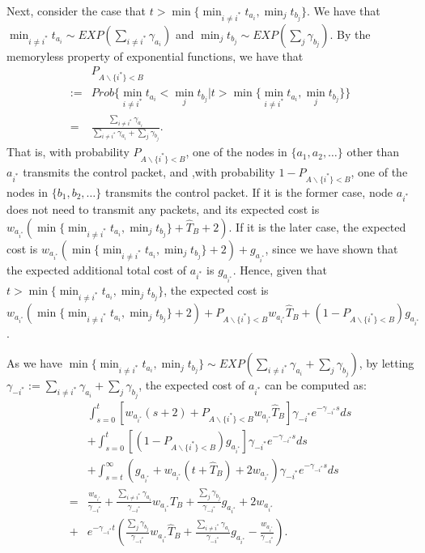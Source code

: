 \documentclass[11pt, conference]{IEEEtran}
\begin{document}
Next, consider the case that $t>\min\{\min_{i\neq i^*}t_{a_i}, \min_jt_{b_j}\}$. We have that $\min_{i\neq i^*}t_{a_i}\sim EXP(\sum_{i\neq i^*}\gamma_{a_i})$ and $\min_jt_{b_j}\sim EXP(\sum_j \gamma_{b_j})$. By the memoryless property of exponential functions, we have that
\begin{align*}
&P_{A\backslash\{i^*\}<B}\\
:=&Prob\{\min_{i\neq i^*}t_{a_i} < \min_jt_{b_j}|t>\min\{\min_{i\neq i^*}t_{a_i}, \min_jt_{b_j}\}\}\\
=&\frac{\sum_{i\neq i^*}\gamma_{a_i}}{\sum_{i\neq i^*}\gamma_{a_i}+\sum_{j}\gamma_{b_j}}.
\end{align*}
That is, with probability $P_{A\backslash\{i^*\}<B}$, one of the nodes in $\{a_1,a_2,\dots\}$ other than $a_{i^*}$ transmits the control packet, and ,with probability $1-P_{A\backslash\{i^*\}<B}$, one of the nodes in $\{b_1,b_2,\dots\}$ transmits the control packet. If it is the former case, node $a_{i^*}$ does not need to transmit any packets, and its expected cost is $w_{a_{i^*}}(\min\{\min_{i\neq i^*}t_{a_i}, \min_jt_{b_j}\}+\hat{T}_B+2)$. If it is the later case, the expected cost is $w_{a_{i^*}}(\min\{\min_{i\neq i^*}t_{a_i}, \min_jt_{b_j}\}+2)+g_{a_{i^*}}$, since we have shown that the expected additional total cost of $a_{i^*}$ is $g_{a_{i^*}}$. Hence, given that $t>\min\{\min_{i\neq i^*}t_{a_i}, \min_jt_{b_j}\}$, the expected cost is $w_{a_{i^*}}(\min\{\min_{i\neq i^*}t_{a_i}, \min_jt_{b_j}\}+2)+P_{A\backslash\{i^*\}<B}w_{a_{i^*}}\hat{T}_B+(1-P_{A\backslash\{i^*\}<B})g_{a_{i^*}}$.

As we have $\min\{\min_{i\neq i^*}t_{a_i}, \min_jt_{b_j}\}\sim EXP(\sum_{i\neq i^*}\gamma_{a_i}+\sum_j\gamma_{b_j})$, by letting $\gamma_{-i^*}:=\sum_{i\neq i^*}\gamma_{a_i}+\sum_j\gamma_{b_j}$, the expected cost of $a_{i^*}$ can be computed as:
\begin{align}
&\int_{s=0}^t [w_{a_{i^*}}(s+2)+P_{A\backslash\{i^*\}<B}w_{a_{i^*}}\hat{T}_B]\gamma_{-i^*}e^{-\gamma_{-i^*}s}ds\nonumber\\
&+\int_{s=0}^t [(1-P_{A\backslash\{i^*\}<B})g_{a_{i^*}}]\gamma_{-i^*}e^{-\gamma_{-i^*}s}ds\nonumber\\
&+\int_{s=t}^\infty (g_{a_{i^*}}+w_{a_{i^*}}(t+\hat{T}_B)+2w_{a_{i^*}})\gamma_{-i^*}e^{-\gamma_{-i^*}s}ds\nonumber\\
=&\frac{w_{a_{i^*}}}{\gamma_{-i^*}}+\frac{\sum_{i\neq i^*}\gamma_{a_i}}{\gamma_{-i^*}}
w_{a_{i^*}}\hat{T}_B+\frac{\sum_{j}\gamma_{b_j}}{\gamma_{-i^*}}g_{a_{i^*}}+2w_{a_{i^*}}\nonumber\\
+&e^{-\gamma_{-i^*}t}(\frac{\sum_{j}\gamma_{b_j}}{\gamma_{-i^*}}w_{a_{i^*}}\hat{T}_B+\frac{\sum_{i\neq i^*}\gamma_{a_i}}{\gamma_{-i^*}}g_{a_{i^*}}-\frac{w_{a_{i^*}}}{\gamma_{-i^*}}).\label{equation:bilateral:total cost}
\end{align}
\end{document}
